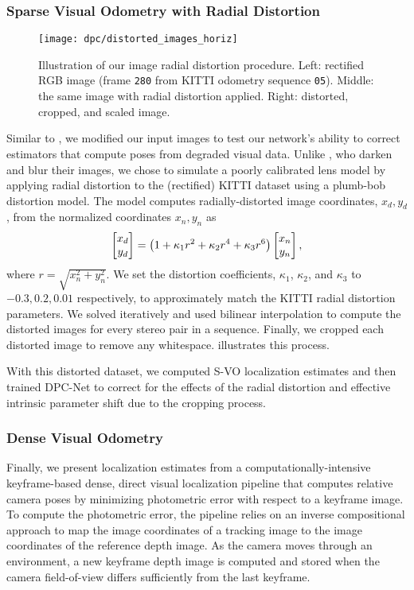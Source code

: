 \subsubsection{Sparse Visual Odometry with Radial Distortion}

\begin{figure*}
	\centering
	\texttt{[image: dpc/distorted\_images\_horiz]}
	\caption{Illustration of our image radial distortion procedure. Left: rectified RGB image  (frame \texttt{280} from KITTI odometry sequence \texttt{05}). Middle: the same image with radial distortion applied. Right: distorted, cropped, and scaled image.}
	\label{fig:distorted_images}
	\vspace{-0.4cm}
\end{figure*}

Similar to \cite{Costante2016-hb}, we modified our input images to test our network's ability to correct estimators that compute poses from degraded visual data. Unlike \cite{Costante2016-hb}, who darken and blur their images, we chose to simulate a poorly calibrated lens model by applying radial distortion to the (rectified) KITTI dataset using a plumb-bob distortion model. The model computes radially-distorted image coordinates, $x_d, y_d$, from the normalized coordinates $x_n, y_n$ as
\begin{equation}
	\label{eq:radial_distortion}
	\begin{bmatrix} x_d \\ y_d \end{bmatrix} = \left( 1 + \kappa_1 r^2 + \kappa_2 r^4 + \kappa_3 r^6  \right) \begin{bmatrix} x_n \\ y_n \end{bmatrix},
\end{equation}
where $r = \sqrt{x_n^2 + y_n^2}$. We set the distortion coefficients, $\kappa_1$, $\kappa_2$, and $\kappa_3$ to $-0.3,0.2,0.01$ respectively, to approximately match the KITTI radial distortion parameters. We solved  iteratively and used bilinear interpolation to compute the distorted images for every stereo pair in a sequence. Finally, we cropped each distorted image to remove any whitespace.  illustrates this process. 

With this distorted dataset, we computed S-VO localization estimates and then trained DPC-Net to correct for the effects of the radial distortion and effective intrinsic parameter shift due to the cropping process.



\subsubsection{Dense Visual Odometry}
Finally, we present localization estimates from a computationally-intensive keyframe-based dense, direct visual localization pipeline \citep{Clement2018-cat} that computes relative camera poses by minimizing photometric error with respect to a keyframe image. To compute the photometric error, the pipeline relies on an inverse compositional approach to map the image coordinates of a tracking image to the image coordinates of the reference depth image. As the camera moves through an environment, a new keyframe depth image is computed and stored when the camera field-of-view differs sufficiently from the last keyframe. 


